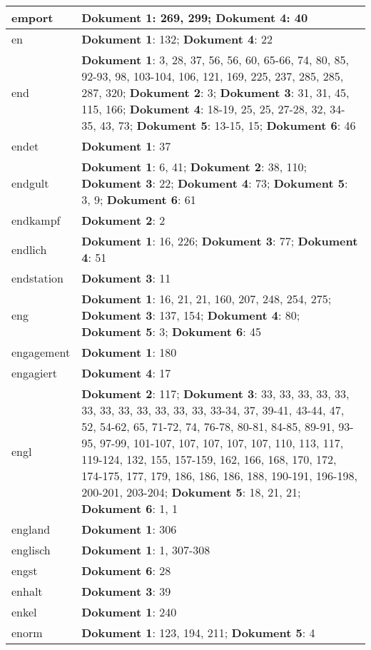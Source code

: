 \documentclass[a5paper]{article}
\begin{document}
\begin{longtable}[l]{|l|p{3in}|}
\hline
emport & \textbf{Dokument 1}: 269, 299; \textbf{Dokument 4}: 40 \\
\hline
en & \textbf{Dokument 1}: 132; \textbf{Dokument 4}: 22 \\
\hline
end & \textbf{Dokument 1}: 3, 28, 37, 56, 56, 60, 65-66, 74, 80, 85, 92-93, 98, 103-104, 106, 121, 169, 225, 237, 285, 285, 287, 320; \textbf{Dokument 2}: 3; \textbf{Dokument 3}: 31, 31, 45, 115, 166; \textbf{Dokument 4}: 18-19, 25, 25, 27-28, 32, 34-35, 43, 73; \textbf{Dokument 5}: 13-15, 15; \textbf{Dokument 6}: 46 \\
\hline
endet & \textbf{Dokument 1}: 37 \\
\hline
endgult & \textbf{Dokument 1}: 6, 41; \textbf{Dokument 2}: 38, 110; \textbf{Dokument 3}: 22; \textbf{Dokument 4}: 73; \textbf{Dokument 5}: 3, 9; \textbf{Dokument 6}: 61 \\
\hline
endkampf & \textbf{Dokument 2}: 2 \\
\hline
endlich & \textbf{Dokument 1}: 16, 226; \textbf{Dokument 3}: 77; \textbf{Dokument 4}: 51 \\
\hline
endstation & \textbf{Dokument 3}: 11 \\
\hline
eng & \textbf{Dokument 1}: 16, 21, 21, 160, 207, 248, 254, 275; \textbf{Dokument 3}: 137, 154; \textbf{Dokument 4}: 80; \textbf{Dokument 5}: 3; \textbf{Dokument 6}: 45 \\
\hline
engagement & \textbf{Dokument 1}: 180 \\
\hline
engagiert & \textbf{Dokument 4}: 17 \\
\hline
engl & \textbf{Dokument 2}: 117; \textbf{Dokument 3}: 33, 33, 33, 33, 33, 33, 33, 33, 33, 33, 33, 33, 33-34, 37, 39-41, 43-44, 47, 52, 54-62, 65, 71-72, 74, 76-78, 80-81, 84-85, 89-91, 93-95, 97-99, 101-107, 107, 107, 107, 107, 110, 113, 117, 119-124, 132, 155, 157-159, 162, 166, 168, 170, 172, 174-175, 177, 179, 186, 186, 186, 188, 190-191, 196-198, 200-201, 203-204; \textbf{Dokument 5}: 18, 21, 21; \textbf{Dokument 6}: 1, 1 \\
\hline
england & \textbf{Dokument 1}: 306 \\
\hline
englisch & \textbf{Dokument 1}: 1, 307-308 \\
\hline
engst & \textbf{Dokument 6}: 28 \\
\hline
enhalt & \textbf{Dokument 3}: 39 \\
\hline
enkel & \textbf{Dokument 1}: 240 \\
\hline
enorm & \textbf{Dokument 1}: 123, 194, 211; \textbf{Dokument 5}: 4 \\

\end{longtable}
\end{document}
